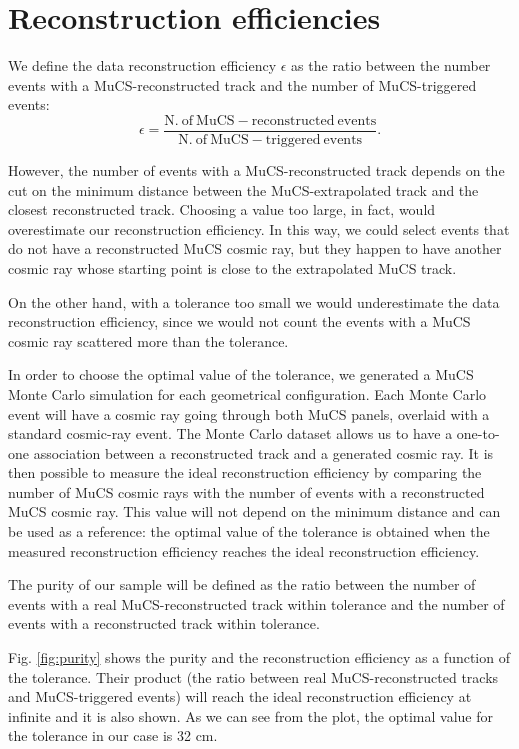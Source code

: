\documentclass[a4paper]{scrartcl}
\begin{document}
\section{Reconstruction efficiencies}\label{sec:reco}
We define the data reconstruction efficiency $\epsilon$ as the ratio between the number events with a MuCS-reconstructed track and the number of MuCS-triggered events:
\begin{equation}
  \epsilon = \frac{\mathrm{N.~of~MuCS-reconstructed~events}}{\mathrm{N.~of~MuCS-triggered~events}}.
\end{equation}

However, the number of events with a MuCS-reconstructed track depends on the cut on the minimum distance between the MuCS-extrapolated track and the closest reconstructed track. Choosing a value too large, in fact, would overestimate our reconstruction efficiency. In this way, we could select events that do not have a reconstructed MuCS cosmic ray, but they happen to have another cosmic ray whose starting point is close to the extrapolated MuCS track.

On the other hand, with a tolerance too small we would underestimate the data reconstruction efficiency, since we would not count the events with a MuCS cosmic ray scattered more than the tolerance.

In order to choose the optimal value of the tolerance, we generated a MuCS Monte Carlo simulation for each geometrical configuration. Each Monte Carlo event will have a cosmic ray going through both MuCS panels, overlaid with a standard cosmic-ray event. The Monte Carlo dataset allows us to have a one-to-one association between a reconstructed track and a generated cosmic ray. It is then possible to measure the ideal reconstruction efficiency by comparing the number of MuCS cosmic rays with the number of events with a reconstructed MuCS cosmic ray. This value will not depend on the minimum distance and can be used as a reference: the optimal value of the tolerance is obtained when the measured reconstruction efficiency reaches the ideal reconstruction efficiency.

The purity of our sample will be defined as the ratio between the number of events with a real MuCS-reconstructed track within tolerance and the number of events with a reconstructed track within tolerance.

Fig. \ref{fig:purity} shows the purity and the reconstruction efficiency as a function of the tolerance. Their product (the ratio between real MuCS-reconstructed tracks and MuCS-triggered events) will reach the ideal reconstruction efficiency at infinite and it is also shown. As we can see from the plot, the optimal value for the tolerance in our case is 32 cm.
\end{document}
